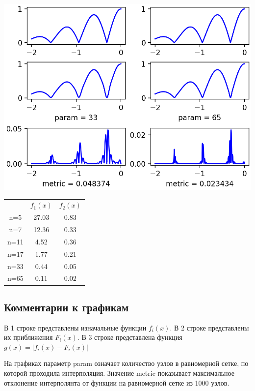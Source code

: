 \documentclass{article}
\begin{document}
\begin{Center}
\includegraphics{F2_p33p65_Splain.png}
\end{Center}

\begin{center}
	
	
	\begin{tabular}{ c   c   c}
		 & \(f_1(x)\) & \(f_2(x)\) \\
		n=5 & 27.03 & 0.83 \\ 
		n=7 & 12.36 & 0.33 \\  
		n=11 & 4.52 & 0.36 \\
		n=17 &  1.77 & 0.21 \\
		n=33 & 0.44  & 0.05 \\
		n=65 & 0.11 & 0.02
	\end{tabular}
	
\end{center}


\subsection{Комментарии к графикам}
В 1 строке представлены изначальные функции \(f_i(x)\).
В 2 строке представлены их приближения \(F_i(x)\).
В 3 строке представлена функция \(g(x) = |f_i(x) - F_i(x)|\)

На графиках параметр {\large param} означает количество узлов в равномерной сетке, по которой проходила интерполяция. Значение {\large metric} показывает максимальное отклонение интерполянта от функции на равномерной сетке из 1000 узлов.
\end{document}
